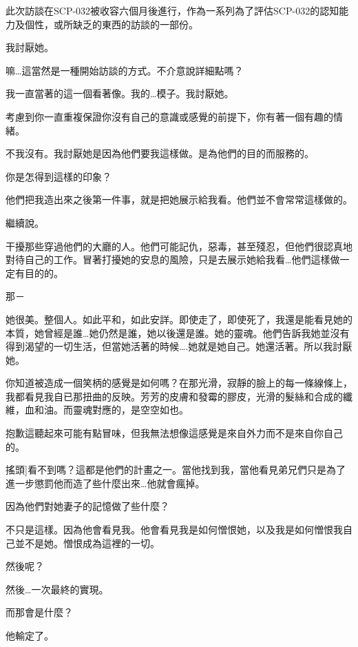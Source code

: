 \begin{scpbox}

此次訪談在SCP-032被收容六個月後進行，作為一系列為了評估SCP-032的認知能力及個性，或所缺乏的東西的訪談的一部份。


我討厭她。

嘛…這當然是一種開始訪談的方式。不介意說詳細點嗎？

我一直當著的這一個看著像。我的…模子。我討厭她。

考慮到你一直重複保證你沒有自己的意識或感覺的前提下，你有著一個有趣的情緒。

不我沒有。我討厭她是因為他們要我這樣做。是為他們的目的而服務的。

你是怎得到這樣的印象？

他們把我造出來之後第一件事，就是把她展示給我看。他們並不會常常這樣做的。

繼續說。

干擾那些穿過他們的大廳的人。他們可能記仇，惡毒，甚至殘忍，但他們很認真地對待自己的工作。冒著打擾她的安息的風險，只是去展示她給我看…他們這樣做一定有目的的。

那－

她很美。整個人。如此平和，如此安詳。即使走了，即使死了，我還是能看見她的本質，她曾經是誰…她仍然是誰，她以後還是誰。她的靈魂。他們告訴我她並沒有得到渴望的一切生活，但當她活著的時候….她就是她自己。她還活著。所以我討厭她。

你知道被造成一個笑柄的感覺是如何嗎？在那光滑，寂靜的臉上的每一條線條上，我都看見我自已那扭曲的反映。芳芳的皮膚和發霉的膠皮，光滑的髮絲和合成的纖維，血和油。而靈魂對應的，是空空如也。

抱歉這聽起來可能有點冒味，但我無法想像這感覺是來自外力而不是來自你自己的。

\bb{SCP-032：}{[}搖頭]看不到嗎？這都是他們的計畫之一。當他找到我，當他看見弟兄們只是為了進一步懲罰他而造了些什麼出來…他就會瘋掉。

因為他們對她妻子的記憶做了些什麼？

不只是這樣。因為他會看見我。他會看見我是如何憎恨她，以及我是如何憎恨我自己並不是她。憎恨成為這裡的一切。

 然後呢？

 然後…一次最終的實現。

 而那會是什麼？

 他輸定了。


\end{scpbox}
